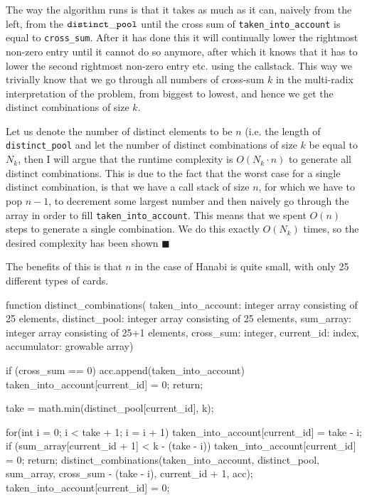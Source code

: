 The way the algorithm runs is that it takes as much as it can, naively from the left, from the ${\tt distinct\_pool}$ until the cross sum of {\tt  taken\_into\_account} is equal to {\tt cross\_sum}. 
After it has done this it will continually lower the rightmost non-zero entry until it cannot do so anymore, after which it knows that it has to lower the second rightmost non-zero entry etc. using the callstack.
This way we trivially know that we go through all numbers of cross-sum $k$ in the multi-radix interpretation of the problem, from biggest to lowest, and hence we get the distinct combinations of size $k$.

Let us denote the number of distinct elements to be $n$ (i.e. the length of {\tt distinct\_pool} and let the number of distinct combinations of size $k$ be equal to $N_k$, then I will argue that the runtime complexity is $O(N_k \cdot n)$ to generate all distinct combinations.
This is due to the fact that the worst case for a single distinct combination, is that we have a call stack of size $n$, for which we have to pop $n-1$, to decrement some largest number and then naively go through the array in order to fill {\tt taken\_into\_account}. 
This means that we spent $O(n)$ steps to generate a single combination.
We do this exactly $O(N_k)$ times, so the desired complexity has been shown $\blacksquare$

The benefits of this is that $n$ in the case of Hanabi is quite small, with only 25 different types of cards.

\begin{verbbox}
function distinct_combinations(
 taken_into_account: integer array consisting of 25 elements, 
 distinct_pool: integer array consisting of 25 elements, 
 sum_array: integer array consisting of 25+1 elements, 
 cross_sum: integer, 
 current_id: index, 
 accumulator: growable array) {
    if (cross_sum == 0) {
        acc.append(taken_into_account) 
        taken_into_account[current_id] = 0;
        return;
    }

    take = math.min(distinct_pool[current_id], k); 

    for(int i = 0; i < take + 1; i = i + 1){
            taken_into_account[current_id] = take - i;
            if (sum_array[current_id + 1] < k - (take - i)) {
                taken_into_account[current_id] = 0;
                return;
            }
            distinct_combinations(taken_into_account, 
	     distinct_pool, 
	     sum_array, 
	     cross_sum - (take - i), 
	     current_id + 1, acc);
     }
     taken_into_account[current_id] = 0;
}
\end{verbbox}
{\centering
\fbox{\theverbbox}
\par
\label{code:distinct-combinations}
}



